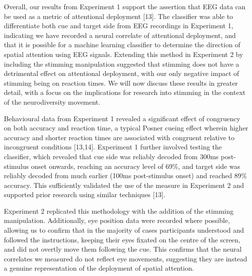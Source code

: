 \documentclass[
  letterpaper,
  DIV=11,
  numbers=noendperiod]{scrartcl}
\begin{document}
Overall, our results from Experiment 1 support the assertion that EEG
data can be used as a metric of attentional deployment {[}13{]}. The
classifier was able to differentiate both cue and target side from EEG
recordings in Experiment 1, indicating we have recorded a neural
correlate of attentional deployment, and that it is possible for a
machine learning classifier to determine the direction of spatial
attention using EEG signals. Extending this method in Experiment 2 by
including the stimming manipulation suggested that stimming does not
have a detrimental effect on attentional deployment, with our only
negative impact of stimming being on reaction times. We will now discuss
these results in greater detail, with a focus on the implications for
research into stimming in the context of the neurodiversity movement.

Behavioural data from Experiment 1 revealed a significant effect of
congruency on both accuracy and reaction time, a typical Posner cueing
effect wherein higher accuracy and shorter reaction times are associated
with congruent relative to incongruent conditions {[}13,14{]}.
Experiment 1 further involved testing the classifier, which revealed
that cue side was reliably decoded from 300ms post-stimulus onset
onwards, reaching an accuracy level of 69\%, and target side was
reliably decoded from much earlier (100ms post-stimulus onset) and
reached 89\% accuracy. This sufficiently validated the use of the
measure in Experiment 2 and supported prior research using similar
techniques {[}13{]}.

Experiment 2 replicated this methodology with the addition of the
stimming manipulation. Additionally, eye position data were recorded
where possible, allowing us to confirm that in the majority of cases
participants understood and followed the instructions, keeping their
eyes fixated on the centre of the screen, and did not overtly move them
following the cue. This confirms that the neural correlates we measured
do not reflect eye movements, suggesting they are instead a genuine
representation of the deployment of spatial attention.
\end{document}
